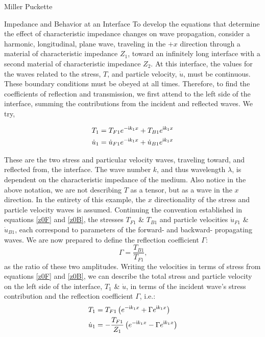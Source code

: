 \documentclass[a4paper,10pt]{report}
\numberwithin{equation}{section}
\begin{document}
\begin{chapter}{Miller Puckette}
\begin{section}{Impedance and Behavior at an Interface}
To develop the equations that determine the effect of characteristic impedance changes on wave propagation, consider a harmonic, longitudinal, plane wave, traveling in the $+x$ direction through a material of characteristic impedance $Z_1$, toward an infinitely long interface with a second material of characteristic impedance $Z_2$. At this interface, the values for the waves related to the stress, $T$, and particle velocity, $\dot{u}$, must be continuous. These boundary conditions must be obeyed at all times. Therefore, to find the coefficients of reflection and transmission, we first attend to the left side of the interface, summing the contributions from the incident and reflected waves. We try, \cite[p.~10]{Kino1987}
\begin{singlespace}
\begin{align}\label{limptv}
T_{1} &= T_{F1}e^{-\mathsf{i}k_1x} + T_{B1}e^{\mathsf{i}k_1x}\notag\\
\dot{u}_{1} &= \dot{u}_{F1}e^{-\mathsf{i}k_1x} + \dot{u}_{B1}e^{\mathsf{i}k_1x}
\end{align}
\end{singlespace}
These are the two stress and particular velocity waves, traveling toward, and reflected from, the interface.
The wave number $k$, and thus wavelength $\lambda$, is dependent on the characteristic impedance of the medium. Also notice in the above notation, we are not describing $T$ as a tensor, but as a wave in the $x$ direction. In the entirety of this example, the $x$ directionality of the stress and particle velocity waves is assumed. Continuing the convention established in equations \eqref{z0F} and \eqref{z0B}, the stresses $T_{F1}$ \& $T_{B1}$ and particle velocities $\dot{u}_{F1}$ \& $\dot{u}_{B1}$, each correspond to parameters of the forward- and backward- propagating waves. We are now prepared to define the reflection coefficient $\Gamma$:
\begin{equation}\label{gamma}
 \Gamma = \frac{T_{B1}}{T_{F1}} \text{,}
\end{equation}
as the ratio of these two amplitudes.
Writing the velocities in terms of stress from equations \eqref{z0F} and \eqref{z0B}, we can describe the total stress and particle velocity on the left side of the interface, $T_1$ \& $\dot{u}$, in terms of the incident wave's stress contribution and the reflection coefficient $\Gamma$, i.e.:
\begin{align}\label{limptv2}
 T_{1} &= T_{F1}\left(e^{-\mathsf{i}k_1x} + \Gamma e^{\mathsf{i}k_1x}\right)\notag \\
 \dot{u}_{1} &= -\frac{T_{F1}}{Z_1}\left(e^{-\mathsf{i}k_1x} - \Gamma e^{\mathsf{i}k_1x}\right)
\end{align}


\end{section}
\end{chapter}
\end{document}
